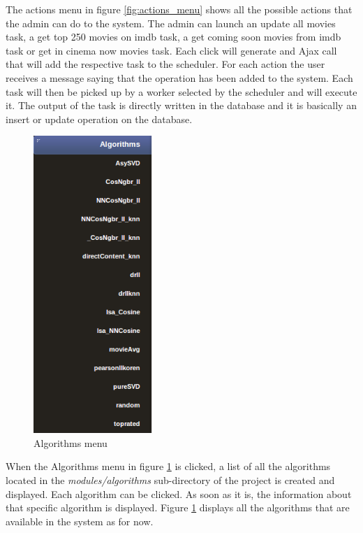 The actions menu in figure \ref{fig:actions_menu} shows all the possible actions that the admin can do to the system. The admin can launch an update all movies task, a get top 250 movies on imdb task, a get coming soon movies from imdb task or get in cinema now movies task. Each click will generate and Ajax \cite{ajax} call that will add the respective task to the scheduler. For each action the user receives a message saying that the operation has been added to the system. Each task will then be picked up by a worker selected by the scheduler and will execute it. The output of the task is directly written in the database and it is basically an insert or update operation on the database.

\begin{figure}
  \centering
  \includegraphics[width=0.4\textwidth]{figures/algorithms_menu.png}
  \caption{Algorithms menu}
  \label{fig:algorithms_menu}
\end{figure}

When the Algorithms menu in figure \ref{fig:algorithms_menu} is clicked, a list of all the algorithms located in the \textit{modules/algorithms} sub-directory of the project is created and displayed. Each algorithm can be clicked. As soon as it is, the information about that specific algorithm is displayed. Figure \ref{fig:algorithms_menu} displays all the algorithms that are available in the system as for now. 

